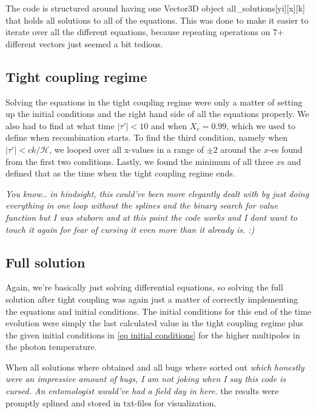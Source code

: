\documentclass[12pt]{article}
\begin{document}
The code is structured around having one Vector3D object all\_solutions[yi][x][k] that holds all solutions to all of the equations. This was done to make it easier to iterate over all the different equations, because repeating operations on 7+ different vectors just seemed a bit tedious.

\subsection{Tight coupling regime}
Solving the equations in the tight coupling regime were only a matter of setting up the initial conditions and the right hand side of all the equations properly. We also had to find at what time  $|\tau'|<10$ and when $X_e=0.99$, which we used to define when recombination starts. To find the third condition, namely when $|\tau'|<ck/\mathcal{H}$, we looped over all x-values in a range of $\pm 2$ around the $x$-es found from the first two conditions. Lastly, we found the minimum of all three $x$s and defined that as the time when the tight coupling regime ends. 

\textit{You know.. in hindsight, this could've been more elegantly dealt with by just doing everything in one loop without the splines and the binary search for value function but I was stuborn and at this point the code works and I dont want to touch it again for fear of cursing it even more than it already is. :)}

\subsection{Full solution}
Again, we're basically just solving differential equations, so solving the full solution after tight coupling was again just a matter of correctly implementing the equations and initial conditions. The initial conditions for this end of the time evolution were simply the last calculated value in the tight coupling regime plus the given initial conditions in \cref{eq initial conditions} for the higher multipoles in the photon temperature. 

When all solutions where obtained and all bugs where sorted out \textit{which honestly were an impressive amount of bugs, I am not joking when I say this code is cursed. An entomologist would've had a field day in here.} the results were promptly splined and stored in txt-files for visualization.
\end{document}
